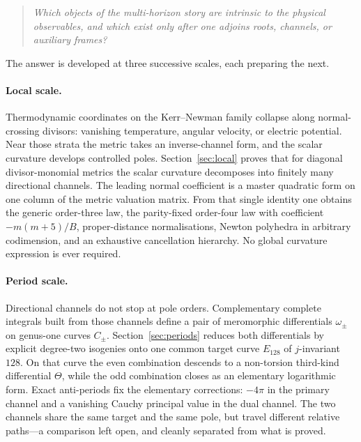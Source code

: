 \documentclass[11pt,a4paper]{article}
\theoremstyle{definition}
\theoremstyle{remark}
\begin{document}
\begin{quote}
\emph{Which objects of the multi-horizon story are intrinsic to the physical
observables, and which exist only after one adjoins roots, channels, or
auxiliary frames?}
\end{quote}

The answer is developed at three successive scales, each preparing the next.

\paragraph{Local scale.}
Thermodynamic coordinates on the Kerr--Newman family collapse along
normal-crossing divisors: vanishing temperature, angular velocity, or electric
potential. Near those strata the metric takes an inverse-channel form, and the
scalar curvature develops controlled poles. Section~\ref{sec:local} proves
that for diagonal divisor-monomial metrics the scalar curvature decomposes into
finitely many directional channels. The leading normal coefficient is a master
quadratic form on one column of the metric valuation matrix. From that single
identity one obtains the generic order-three law, the parity-fixed order-four
law with coefficient \(-m(m+5)/B\), proper-distance normalisations, Newton
polyhedra in arbitrary codimension, and an exhaustive cancellation hierarchy.
No global curvature expression is ever required.

\paragraph{Period scale.}
Directional channels do not stop at pole orders. Complementary complete
integrals built from those channels define a pair of meromorphic differentials
\(\omega_\pm\) on genus-one curves \(C_\pm\). Section~\ref{sec:periods} reduces
both differentials by explicit degree-two isogenies onto one common target
curve \(E_{128}\) of \(j\)-invariant \(128\). On that curve the even combination
descends to a non-torsion third-kind differential \(\Theta\), while the odd
combination closes as an elementary logarithmic form. Exact anti-periods fix
the elementary corrections: \(-4\pi\) in the primary channel and a vanishing
Cauchy principal value in the dual channel. The two channels share the same
target and the same pole, but travel different relative paths---a comparison
left open, and cleanly separated from what is proved.
\end{document}

